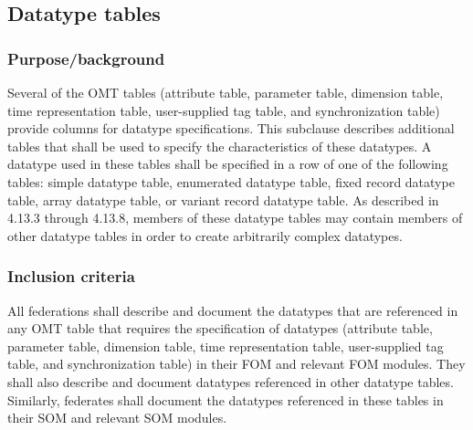 
\subsection{Datatype tables}

\subsubsection{Purpose/background}
Several of the OMT tables (attribute table, parameter table, dimension table, time representation table, user-supplied tag table, and synchronization table) provide columns for datatype specifications. This subclause describes additional tables that shall be used to specify the characteristics of these datatypes. A datatype used in these tables shall be specified in a row of one of the following tables: simple datatype table, enumerated datatype table, fixed record datatype table, array datatype table, or variant record datatype table. As described in 4.13.3 through 4.13.8, members of these datatype tables may contain members of other datatype tables in order to create arbitrarily complex datatypes.


\subsubsection{Inclusion criteria}
All federations shall describe and document the datatypes that are referenced in any OMT table that requires the specification of datatypes (attribute table, parameter table, dimension table, time representation table, user-supplied tag table, and synchronization table) in their FOM and relevant FOM modules. They shall also describe and document datatypes referenced in other datatype tables. Similarly, federates shall document the datatypes referenced in these tables in their SOM and relevant SOM modules.

